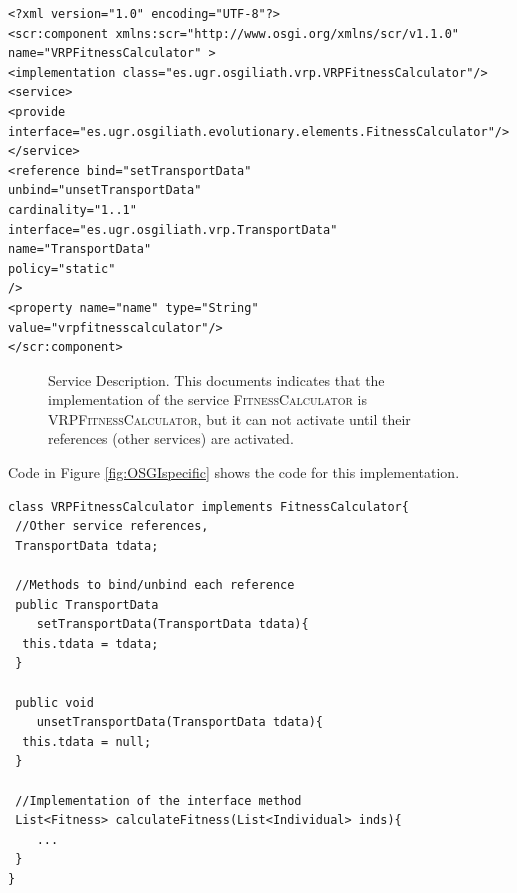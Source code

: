 \newsavebox{\mintedboxOSGIDS}
\begin{lrbox}{\mintedboxOSGIDS}
\begin{minipage}{10cm}
\begin{verbatim}
<?xml version="1.0" encoding="UTF-8"?>
<scr:component xmlns:scr="http://www.osgi.org/xmlns/scr/v1.1.0"
name="VRPFitnessCalculator" >
<implementation class="es.ugr.osgiliath.vrp.VRPFitnessCalculator"/>
<service>
<provide 
interface="es.ugr.osgiliath.evolutionary.elements.FitnessCalculator"/>
</service>
<reference bind="setTransportData"
unbind="unsetTransportData"
cardinality="1..1"
interface="es.ugr.osgiliath.vrp.TransportData"
name="TransportData"
policy="static"
/>
<property name="name" type="String"
value="vrpfitnesscalculator"/>
</scr:component>
\end{verbatim}
\end{minipage}
\end{lrbox}


\begin{figure}
\usebox{\mintedboxOSGIDS}
\caption{Service Description. This documents indicates that the implementation of the service \textsc{FitnessCalculator} is \textsc{VRPFitnessCalculator}, but it can not activate until their references (other services) are activated.}
\label{fig:ds} 
\end{figure}

Code in Figure \ref{fig:OSGIspecific} shows the code for this implementation.

\newsavebox{\mintedboxOSGIspecific}
\begin{lrbox}{\mintedboxOSGIspecific}
\begin{minipage}{10cm}
\begin{verbatim}
class VRPFitnessCalculator implements FitnessCalculator{
 //Other service references,
 TransportData tdata;
 
 //Methods to bind/unbind each reference
 public TransportData 
    setTransportData(TransportData tdata){
  this.tdata = tdata;
 }
	
 public void 
    unsetTransportData(TransportData tdata){
  this.tdata = null;
 }

 //Implementation of the interface method
 List<Fitness> calculateFitness(List<Individual> inds){
 	...
 }
}
\end{verbatim}
\end{minipage}
\end{lrbox}

